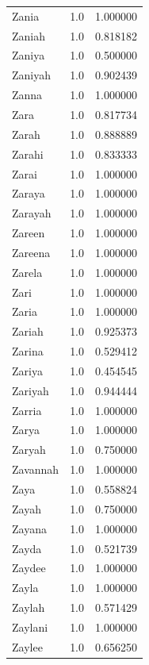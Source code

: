 \documentclass[
  letterpaper,
  DIV=11,
  numbers=noendperiod]{scrreprt}
\begin{document}
\begin{tabular}{lrr}
Zania           &   1.0 &   1.000000 \\
Zaniah          &   1.0 &   0.818182 \\
Zaniya          &   1.0 &   0.500000 \\
Zaniyah         &   1.0 &   0.902439 \\
Zanna           &   1.0 &   1.000000 \\
Zara            &   1.0 &   0.817734 \\
Zarah           &   1.0 &   0.888889 \\
Zarahi          &   1.0 &   0.833333 \\
Zarai           &   1.0 &   1.000000 \\
Zaraya          &   1.0 &   1.000000 \\
Zarayah         &   1.0 &   1.000000 \\
Zareen          &   1.0 &   1.000000 \\
Zareena         &   1.0 &   1.000000 \\
Zarela          &   1.0 &   1.000000 \\
Zari            &   1.0 &   1.000000 \\
Zaria           &   1.0 &   1.000000 \\
Zariah          &   1.0 &   0.925373 \\
Zarina          &   1.0 &   0.529412 \\
Zariya          &   1.0 &   0.454545 \\
Zariyah         &   1.0 &   0.944444 \\
Zarria          &   1.0 &   1.000000 \\
Zarya           &   1.0 &   1.000000 \\
Zaryah          &   1.0 &   0.750000 \\
Zavannah        &   1.0 &   1.000000 \\
Zaya            &   1.0 &   0.558824 \\
Zayah           &   1.0 &   0.750000 \\
Zayana          &   1.0 &   1.000000 \\
Zayda           &   1.0 &   0.521739 \\
Zaydee          &   1.0 &   1.000000 \\
Zayla           &   1.0 &   1.000000 \\
Zaylah          &   1.0 &   0.571429 \\
Zaylani         &   1.0 &   1.000000 \\
Zaylee          &   1.0 &   0.656250 \\

\end{tabular}
\end{document}
